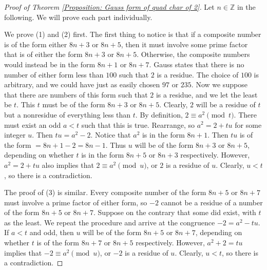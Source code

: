 \documentclass[10pt]{amsart}
\newcommand{\ZZ}{\mathbb{Z}}
\theoremstyle{plain}
\theoremstyle{definition}
\theoremstyle{remark}
\numberwithin{equation}{section}
\begin{document}
\begin{proof}[Proof of Theorem \ref{Proposition: Gauss form of quad char of 2}]
    Let $n\in\ZZ$ in the following. We will prove each part individually. 
    
    \indent We prove (1) and (2) first. The first thing to notice is that if a composite number is of the form either $8n+3$ or $8n+5$, then it must involve some prime factor that is of either the form $8n+3$ or $8n+5$. Otherwise, the composite numbers would instead be in the form $8n+1$ or $8n+7$. Gauss states that there is no number of either form less than $100$ such that $2$ is a residue. The choice of $100$ is arbitrary, and we could have just as easily chosen $97$ or $235$. Now we suppose that there are numbers of this form such that $2$ is a residue, and we let the least be $t$. This $t$ must be of the form $8n+3$ or $8n+5$. Clearly, $2$ will be a residue of $t$ but a nonresidue of everything less than $t$. By definition, $2\equiv a^{2}\pmod{t}$. There must exist an odd $a<t$ such that this is true. Rearrange, so $a^{2}=2+tu$ for some integer $u$. Then $tu=a^{2}-2$. Notice that $a^{2}$ is in the form $8n+1$. Then $tu$ is of the form $=8n+1-2=8n-1$. Thus $u$ will be of the form $8n+3$ or $8n+5$, depending on whether $t$ is in the form $8n+5$ or $8n+3$ respectively. However, $a^{2}=2+tu$ also implies that $2\equiv a^{2}\pmod{u}$, or $2$ is a residue of $u$. Clearly, $u<t$, so there is a contradiction. 
    
    \indent The proof of (3) is similar. Every composite number of the form $8n+5$ or $8n+7$ must involve a prime factor of either form, so $-2$ cannot be a residue of a number of the form $8n+5$ or $8n+7$. Suppose on the contrary that some did exist, with $t$ as the least. We repeat the procedure and arrive at the congruence $-2=a^{2}-tu$. If $a<t$ and odd, then $u$ will be of the form $8n+5$ or $8n+7$, depending on whether $t$ is of the form $8n+7$ or $8n+5$ respectively. However, $a^{2}+2=tu$ implies that $-2\equiv a^{2}\pmod{u}$, or $-2$ is a residue of $u$. Clearly, $u<t$, so there is a contradiction. 
    

\end{proof}
\end{document}
